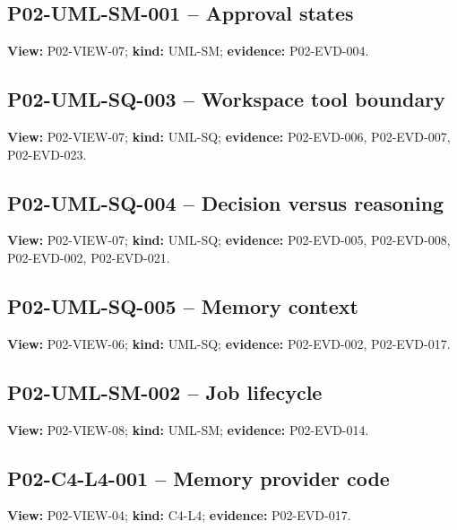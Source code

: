 \documentclass[10pt,letterpaper]{article}
\begin{document}
\subsection{P02-UML-SM-001 -- Approval states}
\textbf{View:} P02-VIEW-07; \textbf{kind:} UML-SM; \textbf{evidence:} P02-EVD-004.\par
{}
\clearpage

\subsection{P02-UML-SQ-003 -- Workspace tool boundary}
\textbf{View:} P02-VIEW-07; \textbf{kind:} UML-SQ; \textbf{evidence:} P02-EVD-006, P02-EVD-007, P02-EVD-023.\par
{}
\clearpage

\subsection{P02-UML-SQ-004 -- Decision versus reasoning}
\textbf{View:} P02-VIEW-07; \textbf{kind:} UML-SQ; \textbf{evidence:} P02-EVD-005, P02-EVD-008, P02-EVD-002, P02-EVD-021.\par
{}
\clearpage

\subsection{P02-UML-SQ-005 -- Memory context}
\textbf{View:} P02-VIEW-06; \textbf{kind:} UML-SQ; \textbf{evidence:} P02-EVD-002, P02-EVD-017.\par
{}
\clearpage

\subsection{P02-UML-SM-002 -- Job lifecycle}
\textbf{View:} P02-VIEW-08; \textbf{kind:} UML-SM; \textbf{evidence:} P02-EVD-014.\par
{}
\clearpage

\subsection{P02-C4-L4-001 -- Memory provider code}
\textbf{View:} P02-VIEW-04; \textbf{kind:} C4-L4; \textbf{evidence:} P02-EVD-017.\par
{}
\clearpage
\end{document}

